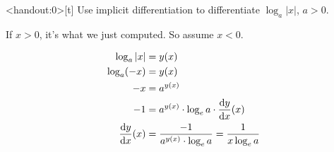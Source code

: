 \begin{frame}<handout:0>[t]
Use implicit differentiation to differentiate $\log_a|x|$, $a>0$.\pause
\color{answercolor}\vfill

If $x>0$, it's what we just computed. So assume $x<0$.

\begin{align*}
\log_a |x| &= y(x)\\
\log_a (-x) &= y(x)\\
-x&=a^{y(x)}\\
-1&=a^{y(x)} \cdot \log_e a \cdot \frac{\text{d}y}{\text{d}x}(x)\\
\frac{\text{d}y}{\text{d}x}(x)&=\frac{-1}{a^{y(x)} \cdot \log_e a} = \frac{1}{x\log_e a}
\end{align*}

\end{frame}

